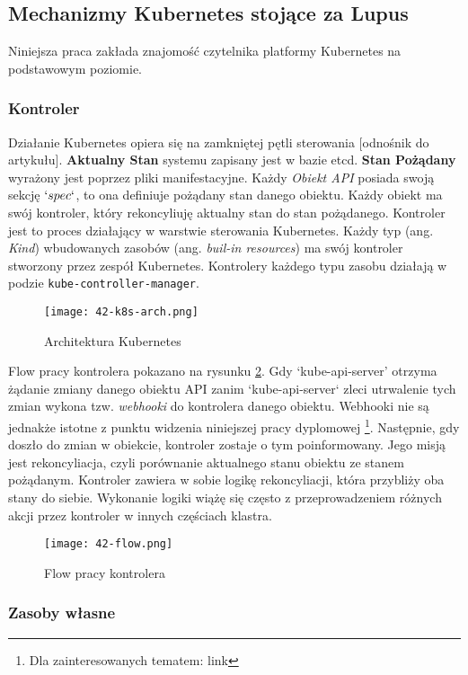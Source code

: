 \subsection{Mechanizmy Kubernetes stojące za Lupus}
Niniejsza praca zakłada znajomość czytelnika platformy Kubernetes na podstawowym poziomie.

\subsubsection{Kontroler}
Działanie Kubernetes opiera się na zamkniętej pętli sterowania [odnośnik do artykułu]. \textbf{Aktualny Stan} systemu zapisany jest w bazie etcd. \textbf{Stan Pożądany} wyrażony jest poprzez pliki manifestacyjne. Każdy \textit{Obiekt API} posiada swoją sekcję $`spec`$, to ona definiuje pożądany stan danego obiektu. Każdy obiekt ma swój kontroler, który rekoncyliuję aktualny stan do stan pożądanego. Kontroler jest to proces działający w warstwie sterowania Kubernetes. Każdy typ (ang. \textit{Kind}) wbudowanych zasobów (ang. \textit{buil-in resources}) ma swój kontroler stworzony przez zespół Kubernetes. Kontrolery każdego typu zasobu działają w podzie \texttt{kube-controller-manager}. 

\begin{figure}[!h]
    \centering \texttt{[image: 42-k8s-arch.png]}
    \caption{Architektura Kubernetes}\label{fig:42-k8s-arch}
\end{figure}

Flow pracy kontrolera pokazano na rysunku \ref{fig:42-flow}. Gdy `kube-api-server' otrzyma żądanie zmiany danego obiektu API zanim `kube-api-server` zleci utrwalenie tych zmian wykona tzw. \textit{webhooki} do kontrolera danego obiektu. Webhooki nie są jednakże istotne z punktu widzenia niniejszej pracy dyplomowej \footnote{Dla zainteresowanych tematem: link}. Następnie, gdy doszło do zmian w obiekcie, kontroler zostaje o tym poinformowany. Jego misją jest rekoncyliacja, czyli porównanie aktualnego stanu obiektu ze stanem pożądanym. Kontroler zawiera w sobie logikę rekoncyliacji, która przybliży oba stany do siebie. Wykonanie logiki wiążę się często z przeprowadzeniem różnych akcji przez kontroler w innych częściach klastra. 

\begin{figure}[!h]
    \centering \texttt{[image: 42-flow.png]}
    \caption{Flow pracy kontrolera}\label{fig:42-flow}
\end{figure}

\subsubsection{Zasoby własne} 

